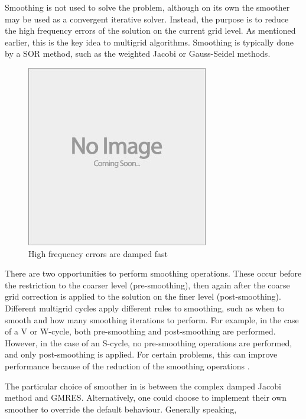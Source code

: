 Smoothing is not used to solve the problem, although on its own the smoother may be used as a convergent iterative solver.
Instead, the purpose is to reduce the high frequency errors of the solution on the current grid level.
As mentioned earlier, this is the key idea to multigrid algorithms.
Smoothing is typically done by a SOR method, such as the weighted Jacobi or Gauss-Seidel methods.

\begin{figure}
	\centering
	\includegraphics[draft]{images/placeholder}
	\caption{High frequency errors are damped fast}
\end{figure}


There are two opportunities to perform smoothing operations.
These occur before the restriction to the coarser level (pre-smoothing), then again after the coarse grid correction is applied to the solution on the finer level (post-smoothing).
Different multigrid cycles apply different rules to smoothing, such as when to smooth and how many smoothing iterations to perform.
For example, in the case of a V or W-cycle, both pre-smoothing and post-smoothing are performed.
However, in the case of an S-cycle, no pre-smoothing operations are performed, and only post-smoothing is applied.
For certain problems, this can improve performance because of the reduction of the smoothing operations \cite{iyengar}.

The particular choice of smoother in \oomph is between the complex damped Jacobi method and GMRES.
Alternatively, one could choose to implement their own smoother to override the default behaviour.
Generally speaking, 

